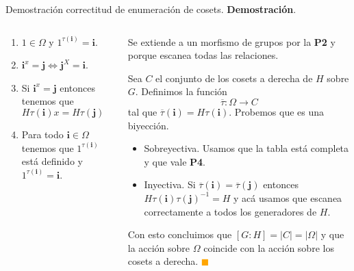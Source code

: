 \documentclass[aspectratio=169, 9pt]{beamer}
\renewcommand\qedsymbol{\textcolor{orange}{$\blacksquare$}}
\newcommand{\ol}{\overline}
\begin{document}
\begin{frame}[fragile]{Demostración correctitud de enumeración de cosets.}
	\textbf{Demostración}.  
	\begin{columns}
		\begin{column}{0.3 \textwidth}
			\begin{enumerate}
				\item $1 \in \Omega$ y $1^{\tau(\textbf{i})} = \textbf{i}$.
				
				\item $\textbf{i}^x = \textbf{j} \iff \textbf{j}^{X} = \textbf{i}$.
				
				\item Si $\textbf{i}^x = \textbf{j}$ entonces tenemos que $H \tau(\textbf{i}) x = H \tau(\textbf{j})$
				
				\item Para todo $\textbf{i} \in \Omega$ tenemos que $1^{\tau(\textbf{i})}$ está definido y $1^{\tau(\textbf{i})} = \textbf{i}$.
				\pause
			\end{enumerate}
		\end{column}
		\begin{column}{0.7 \textwidth}
			Se extiende a un morfismo de grupos por la \textbf{P2} y porque escanea todas las relaciones.	
			\pause
			
			\medskip
			Sea $C$ el conjunto de los cosets a derecha de $H$ sobre $G$.
			Definimos la función 
			\[
			\ol \tau: \Omega \to C
			\]
			tal que $\ol \tau (\textbf{i}) = H \tau (\textbf{i})$.
			\pause
			Probemos que es una biyección.
			\pause
			\begin{itemize}
				\item Sobreyectiva. Usamos que la tabla está completa y que vale \textbf{P4}.
				\pause
				\item Inyectiva. Si $\ol \tau (\textbf{i}) = \ol \tau (\textbf{j})$ entonces $H \tau (\textbf{i}) \tau (\textbf{j})^{-1} = H$ y acá usamos que escanea correctamente a todos los generadores de $H$.
				\pause
			\end{itemize}
			Con esto concluimos que $[G:H] = |C| = |\Omega|$ y que la acción sobre $\Omega$ coincide con la acción sobre los cosets a derecha.	
			\qedsymbol
		\end{column}
	\end{columns}
\end{frame}
\end{document}
